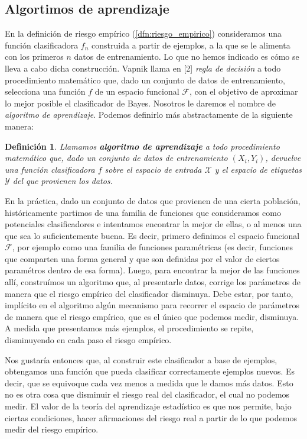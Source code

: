 \documentclass{report}
\newtheorem{dfn}{Definición}[subsection]
\begin{document}
\subsection{Algortimos de aprendizaje}

En la definición de riesgo empírico (\ref{dfn:riesgo_empirico}) consideramos una función clasificadora $f_n$ construida a partir
de ejemplos, a la que se le alimenta con los primeros $n$ datos de entrenamiento. Lo que no hemos indicado es cómo se lleva a cabo dicha construcción. 
Vapnik llama en [2] \textit{regla de decisión } a todo procedimiento matemático que, dado un conjunto de datos de entrenamiento, selecciona una función 
$f$ de un espacio funcional $\mathcal{F}$, con el objetivo de aproximar lo mejor posible el clasificador de Bayes. Nosotros le daremos el nombre de
\textit{algoritmo de aprendizaje}. Podemos definirlo más abstractamente de la siguiente manera:

\begin{dfn}
Llamamos \textbf{algoritmo de aprendizaje} a todo procedimiento matemático que, dado un conjunto
de datos de entrenamiento $(X_i,Y_i)$, devuelve una función clasificadora $f$ sobre el espacio de entrada $\mathcal{X}$ y el espacio de etiquetas $\mathcal{Y}$ del que
provienen los datos.
\end{dfn}

En la práctica, dado un conjunto de datos que provienen de una cierta población, históricamente partimos de una familia de funciones que
consideramos como potenciales clasificadores e intentamos encontrar la mejor de ellas, o al menos una que sea lo suficientemente buena. Es decir,
primero definimos el espacio funcional $\mathcal{F}$, por ejemplo como una familia de funciones paramétricas (es decir, funciones que comparten
una forma general y que son definidas por el valor de ciertos paramétros dentro de esa forma). Luego, para encontrar la mejor de 
las funciones allí, construímos un algoritmo que, al presentarle datos, corrige los parámetros de manera que el riesgo empírico del clasificador 
disminuya. Debe estar, por tanto, implícito en el algoritmo algún mecanismo para recorrer el espacio de parámetros de manera que el riesgo empírico,
que es el único que podemos medir, disminuya. A medida que presentamos más ejemplos, el procedimiento se repite, disminuyendo en cada paso el riesgo
empírico. \newline

Nos gustaría entonces que, al construir este clasificador a base de ejemplos, obtengamos una función que pueda clasificar correctamente
ejemplos nuevos. Es decir, que se equivoque cada vez menos a medida que le damos más datos. Esto no es otra cosa que disminuir el riesgo real 
del clasificador, el cual no podemos medir. El valor de la teoría del aprendizaje estadístico es que nos permite, bajo ciertas condiciones,
hacer afirmaciones del riesgo real a partir de lo que podemos medir del riesgo empírico.\newline
\end{document}
